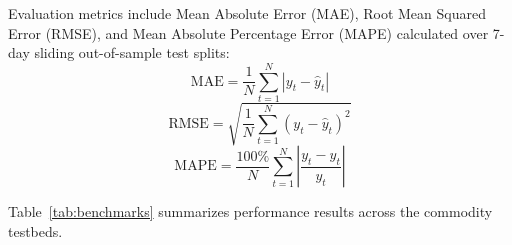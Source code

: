 \documentclass[conference]{IEEEtran}
\begin{document}
Evaluation metrics include Mean Absolute Error (MAE), Root Mean Squared Error (RMSE), and Mean Absolute Percentage Error (MAPE) calculated over 7-day sliding out-of-sample test splits:
\begin{equation}
\text{MAE} = \frac{1}{N}\sum_{t=1}^{N} |y_t - \hat{y}_t|
\end{equation}
\begin{equation}
\text{RMSE} = \sqrt{\frac{1}{N}\sum_{t=1}^{N} (y_t - \hat{y}_t)^2}
\end{equation}
\begin{equation}
\text{MAPE} = \frac{100\%}{N}\sum_{t=1}^{N} \left| \frac{y_t - \hat{y}_t}{y_t} \right|
\end{equation}

Table~\ref{tab:benchmarks} summarizes performance results across the commodity testbeds.
\end{document}
